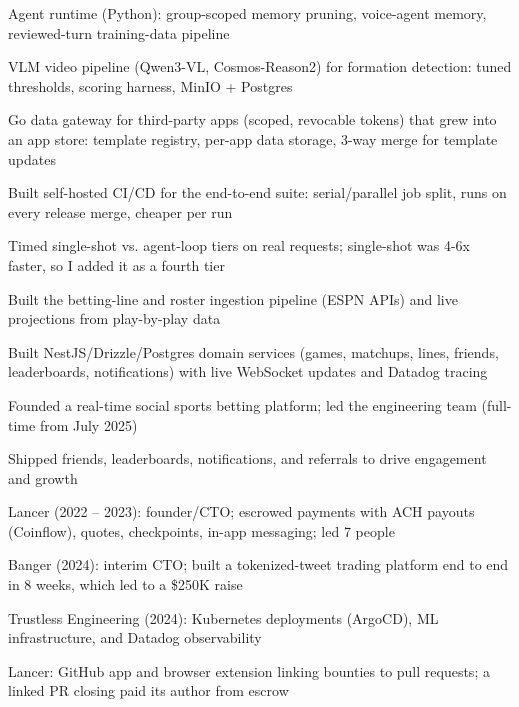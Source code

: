 \documentclass[print]{jack-resume}
\begin{document}
\begin{tightemize}
    \item Agent runtime (Python): group-scoped memory pruning, voice-agent memory, reviewed-turn training-data pipeline
    \item VLM video pipeline (Qwen3-VL, Cosmos-Reason2) for formation detection: tuned thresholds, scoring harness, MinIO + Postgres
    \item Go data gateway for third-party apps (scoped, revocable tokens) that grew into an app store: template registry, per-app data storage, 3-way merge for template updates
    \item Built self-hosted CI/CD for the end-to-end suite: serial/parallel job split, runs on every release merge, cheaper per run
    \item Timed single-shot vs. agent-loop tiers on real requests; single-shot was 4-6x faster, so I added it as a fourth tier
\end{tightemize}
\sectionsep

\begin{tightemize}
    \item Built the betting-line and roster ingestion pipeline (ESPN APIs) and live projections from play-by-play data
    \item Built NestJS/Drizzle/Postgres domain services (games, matchups, lines, friends, leaderboards, notifications) with live WebSocket updates and Datadog tracing
    \item Founded a real-time social sports betting platform; led the engineering team (full-time from July 2025)
    \item Shipped friends, leaderboards, notifications, and referrals to drive engagement and growth
\end{tightemize}
\sectionsep

\begin{tightemize}
    \item Lancer (2022 -- 2023): founder/CTO; escrowed payments with ACH payouts (Coinflow), quotes, checkpoints, in-app messaging; led 7 people
    \item Banger (2024): interim CTO; built a tokenized-tweet trading platform end to end in 8 weeks, which led to a \$250K raise
    \item Trustless Engineering (2024): Kubernetes deployments (ArgoCD), ML infrastructure, and Datadog observability
    \item Lancer: GitHub app and browser extension linking bounties to pull requests; a linked PR closing paid its author from escrow
\end{tightemize}
\sectionsep
\end{document}
